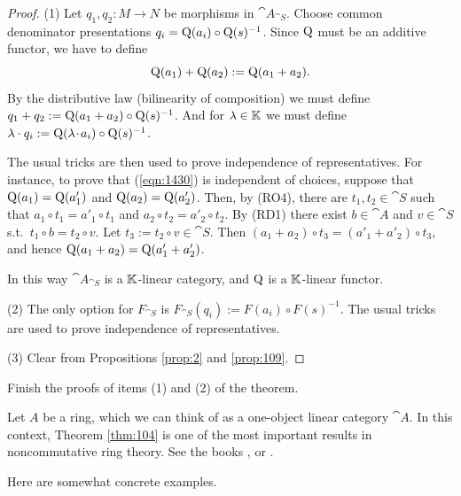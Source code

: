 \begin{proof} \mbox{}

\smallskip \noindent
(1) Let $q_1, q_2 : M \to N$ be morphisms in $\cat{A}_{\cat{S}}$.
Choose common denominator presentations
$q_i = \operatorname{Q}(a_i) \circ \operatorname{Q}(s)^{-1}$. Since $\operatorname{Q}$ must be an additive 
functor, we have to define 
\begin{equation} \label{eqn:1430}
\operatorname{Q}(a_1) + \operatorname{Q}(a_2) := \operatorname{Q}(a_1 + a_2) .
\end{equation}
By the distributive law (bilinearity of composition) we must define 
$q_1 + q_2 := \operatorname{Q}(a_1 + a_2) \circ \operatorname{Q}(s)^{-1}$.
And for $\lambda \in \mathbb{K}$ we must define 
$\lambda \cdot q_i := \operatorname{Q}(\lambda \mspace{1.5mu}{\cdot}\mspace{1.5mu} a_i) \circ \operatorname{Q}(s)^{-1}$.

The usual tricks are then used to prove independence of representatives. 
For instance, to prove that (\ref{eqn:1430}) is independent of choices, suppose 
that $\operatorname{Q}(a_1) = \operatorname{Q}(a'_1)$ and $\operatorname{Q}(a_2) = \operatorname{Q}(a'_2)$. 
Then, by (RO4), there are $t_1, t_2 \in \cat{S}$ such that 
$a_1 \circ t_1 = a'_1 \circ t_1$ and $a_2 \circ t_2 = a'_2 \circ t_2$. 
By (RD1) there exist $b \in \cat{A}$ and $v \in \cat{S}$ s.t.\ 
$t_1 \circ b = t_2 \circ v$. 
Let $t_3 := t_2 \circ v \in \cat{S}$.
Then 
$(a_1 + a_2) \circ t_3 = (a'_1 + a'_2) \circ t_3$,
and hence 
$\operatorname{Q}(a_1 + a_2) = \operatorname{Q}(a'_1 + a'_2)$. 

In this way $\cat{A}_{\cat{S}}$ is a $\mathbb{K}$-linear category, and $\operatorname{Q}$ is a 
$\mathbb{K}$-linear functor. 

\medskip \noindent (2)
The only option for $F_{\cat{S}}$ is 
$F_{\cat{S}}(q_i) := F(a_i) \circ F(s)^{-1}$. 
The usual tricks are used to prove independence of representatives.

\medskip \noindent 
(3) Clear from Propositions \ref{prop:2} and \ref{prop:109}. 
\end{proof}

\begin{exer} \label{exer:5025}
Finish the proofs of items (1) and (2) of the theorem. 
\end{exer}


\begin{rem} \label{rem:4202}
Let $A$ be a ring, which we can think of as a one-object linear category
$\cat{A}$. In this context, Theorem
\ref{thm:104} is one of the most important results in noncommutative ring 
theory. See the books \cite{McRo}, \cite{Row} or \cite{Ste}. 
\end{rem}

Here are somewhat concrete examples. 

